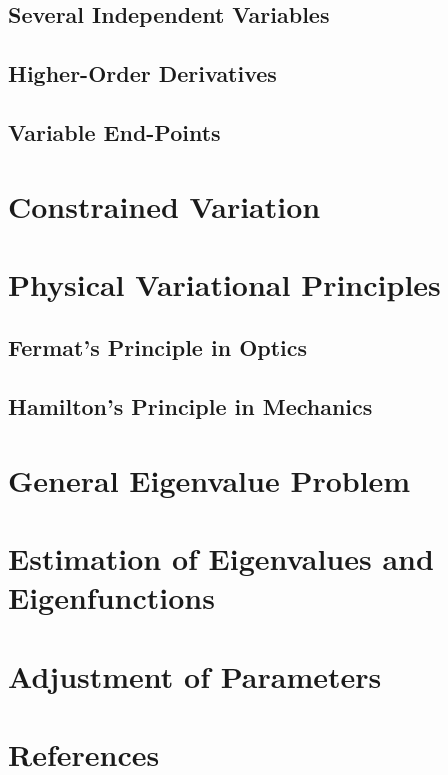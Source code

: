 \documentclass[]{article}
\begin{document}
\subsection{Several Independent Variables}
\subsection{Higher-Order Derivatives}
\subsection{Variable End-Points}
\section{Constrained Variation}
\section{Physical Variational Principles}
\subsection{Fermat's Principle in Optics}
\subsection{Hamilton's Principle in Mechanics}
\section{General Eigenvalue Problem}
\section{Estimation of Eigenvalues and Eigenfunctions}
\section{Adjustment of Parameters}
\section*{References}
\end{document}
